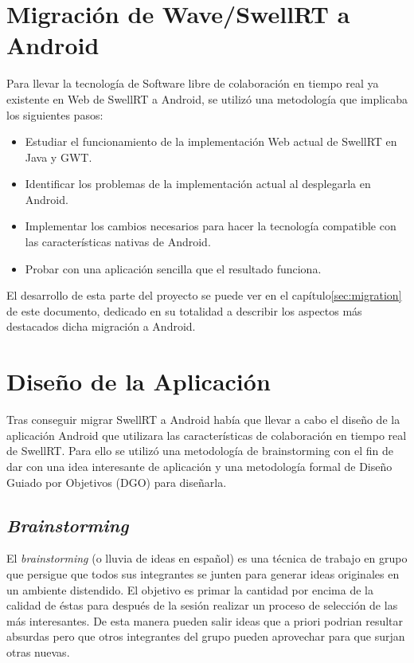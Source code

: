 \section{Migración de Wave/SwellRT a Android}

Para llevar la tecnología de Software libre de colaboración en tiempo real ya existente en Web de SwellRT a Android, se utilizó una metodología que implicaba los siguientes pasos:

    \begin{itemize}
      \item Estudiar el funcionamiento de la implementación Web actual de SwellRT en Java y GWT.
      \item Identificar los problemas de la implementación actual al desplegarla en Android. 
      \item Implementar los cambios necesarios para hacer la tecnología compatible con las características nativas de Android.
      \item Probar con una aplicación sencilla que el resultado funciona.
    \end{itemize}
    
El desarrollo de esta parte del proyecto se puede ver en el capítulo\ref{sec:migration} de este documento, dedicado en su totalidad a describir los aspectos más destacados dicha migración a Android. 

\section{Diseño de la Aplicación}

	Tras conseguir migrar SwellRT a Android había que llevar a cabo el diseño de la aplicación Android que utilizara las características de colaboración en tiempo real de SwellRT. Para ello se utilizó una metodología de brainstorming con el fin de dar con una idea interesante de aplicación y una metodología formal de Diseño Guiado por Objetivos (DGO) para diseñarla.

  \subsection{\textit{Brainstorming}}
  
  El \textit{brainstorming} \cite{ref:bookBrainStorming} (o lluvia de ideas en español) es una técnica de trabajo en grupo que persigue que todos sus integrantes se junten para generar ideas originales en un ambiente distendido. El objetivo es primar la cantidad por encima de la calidad de éstas para después de la sesión realizar un proceso de selección de las más interesantes. De esta manera pueden salir ideas que a priori podrian resultar absurdas pero que otros integrantes del grupo pueden aprovechar para que surjan otras nuevas. 
  

